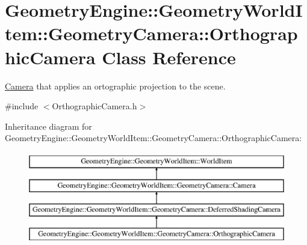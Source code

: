 \hypertarget{class_geometry_engine_1_1_geometry_world_item_1_1_geometry_camera_1_1_orthographic_camera}{}\section{Geometry\+Engine\+::Geometry\+World\+Item\+::Geometry\+Camera\+::Orthographic\+Camera Class Reference}
\label{class_geometry_engine_1_1_geometry_world_item_1_1_geometry_camera_1_1_orthographic_camera}


\mbox{\hyperlink{class_geometry_engine_1_1_geometry_world_item_1_1_geometry_camera_1_1_camera}{Camera}} that applies an ortographic projection to the scene.  




{\ttfamily \#include $<$Orthographic\+Camera.\+h$>$}

Inheritance diagram for Geometry\+Engine\+::Geometry\+World\+Item\+::Geometry\+Camera\+::Orthographic\+Camera\+:\begin{figure}[H]
\begin{center}
\leavevmode
\includegraphics[height=4.000000cm]{class_geometry_engine_1_1_geometry_world_item_1_1_geometry_camera_1_1_orthographic_camera}
\end{center}
\end{figure}
